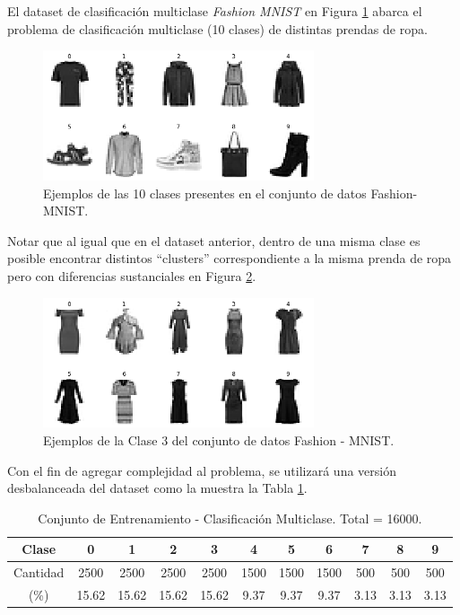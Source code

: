 El dataset de clasificación multiclase \textit{Fashion MNIST} \cite{FashionMNIST} en Figura \ref{fig:fashion_mnist} abarca el problema de clasificación multiclase (10 clases) de distintas prendas de ropa. 

\begin{figure}[ht]
    \centering
    \includegraphics[width=8cm]{img/tesis/fashion_mnist.png}
    \caption{Ejemplos de las 10 clases presentes en el conjunto de datos Fashion-MNIST.}
    \label{fig:fashion_mnist}
\end{figure}

\vspace{0.2cm}

Notar que al igual que en el dataset anterior, dentro de una misma clase es posible encontrar distintos ``clusters'' correspondiente a la misma prenda de ropa pero con diferencias sustanciales en Figura \ref{fig:fashion_mnist_label_3}.

\vspace{0.2CM}

\begin{figure}[ht]
    \centering
    \includegraphics[width=8cm]{img/tesis/fashion_mnist_label_3.png}
    \caption{Ejemplos de la Clase 3 del conjunto de datos Fashion - MNIST.}
    \label{fig:fashion_mnist_label_3}
\end{figure}

Con el fin de agregar complejidad al problema, se utilizará una versión desbalanceada del dataset como la muestra la Tabla \ref{table:fashion_mnist}.

\begin{table}[ht]
\begin{tabular}{|c|c|c|c|c|c|c|c|c|c|c|}
\hline
Clase    & 0    & 1    & 2    & 3    & 4    & 5    & 6   & 7   & 8   & 9   \\ \hline
Cantidad & 2500 & 2500 & 2500 & 2500 & 1500 & 1500 & 1500 & 500 & 500 & 500 \\ \hline
(\%) & 15.62 & 15.62 & 15.62 & 15.62 & 9.37 & 9.37 & 9.37 & 3.13 & 3.13 & 3.13 \\ \hline
\end{tabular}
\caption{Conjunto de Entrenamiento - Clasificación Multiclase. Total = 16000.}
\label{table:fashion_mnist}
\end{table}

